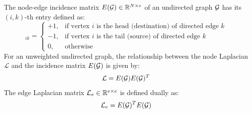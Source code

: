 \begin{definition}\label{def:incidence_matrix}
The node-edge incidence matrix $E(\mathcal{G}) \in \mathbb{R}^{N \times e}$ of an undirected graph $\mathcal{G}$ has its $(i, k)$-th entry defined as:
\begin{equation}
    [E(\G)]_{ik} = \begin{cases}
        +1, & \text{if vertex } i \text{ is the head (destination) of directed edge } k \\
        -1, & \text{if vertex } i \text{ is the tail (source) of directed edge } k \\
        0, & \text{otherwise}
    \end{cases}
\end{equation}
For an unweighted undirected graph, the relationship between the node Laplacian $\mathcal{L}$ and the incidence matrix $E(\mathcal{G})$ is given by:
\begin{equation}
    \mathcal{L} = E(\mathcal{G}) E(\mathcal{G})^T
\end{equation}
The edge Laplacian matrix $\mathcal{L}_e \in \mathbb{R}^{e \times e}$ is defined dually as:
\begin{equation}
    \mathcal{L}_e = E(\mathcal{G})^T E(\mathcal{G})
\end{equation}
\end{definition}
